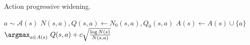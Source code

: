 \begin{algorithm}[H]
    \small
    \caption{Action progressive widening.}
    \label{alg:mcts-action-pw}
    \begin{algorithmic}[1]
                \State $a \sim \mathcal{A}(s)$ \label{line:apw-sample}
                \State $N(s,a), Q(s,a) \leftarrow N_0(s,a), Q_0(s,a)$
                \State $A(s) \leftarrow A(s) \cup \{a\}$
            \EndIf
            \State \Return ${\displaystyle\argmax_{a \in A(s)}}\ Q(s,a) + c\sqrt{\frac{\log N(s)}{N(s,a)}}$ \label{line:apw-ucb}
        \EndFunction
    \end{algorithmic}
\end{algorithm}